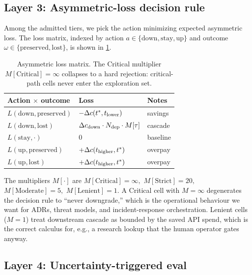 \subsection{Layer 3: Asymmetric-loss decision rule}
\label{sec:layer3}

Among the admitted tiers, we pick the action minimizing expected
asymmetric loss. The loss matrix, indexed by action
$a \in \{\mathrm{down}, \mathrm{stay}, \mathrm{up}\}$ and outcome $\omega
\in \{\mathrm{preserved}, \mathrm{lost}\}$, is shown in
\cref{tab:loss-matrix}.

\begin{table}[h]
\centering
\caption{Asymmetric loss matrix. The Critical multiplier $M[\text{Critical}] = \infty$
collapses to a hard rejection: critical-path cells never enter the
exploration set.}
\label{tab:loss-matrix}
\begin{tabular}{lll}
\toprule
\textbf{Action $\times$ outcome} & \textbf{Loss} & \textbf{Notes} \\
\midrule
$L(\mathrm{down}, \mathrm{preserved})$ & $-\Delta c(t^*, t_{\mathrm{lower}})$ & savings \\
$L(\mathrm{down}, \mathrm{lost})$
  & $\Delta c_{\mathrm{down}} \cdot N_{\mathrm{dep}} \cdot M[\tau]$
  & cascade \\
$L(\mathrm{stay}, \cdot)$ & $0$ & baseline \\
$L(\mathrm{up}, \mathrm{preserved})$ & $+\Delta c(t_{\mathrm{higher}}, t^*)$ & overpay \\
$L(\mathrm{up}, \mathrm{lost})$ & $+\Delta c(t_{\mathrm{higher}}, t^*)$ & overpay \\
\bottomrule
\end{tabular}
\end{table}

The multipliers $M[\cdot]$ are
\(
  M[\text{Critical}] = \infty,
\)
\(
  M[\text{Strict}] = 20,
\)
\(
  M[\text{Moderate}] = 5,
\)
\(
  M[\text{Lenient}] = 1.
\)
A Critical cell with $M = \infty$ degenerates the decision rule to
``never downgrade,'' which is the operational behaviour we want for ADRs,
threat models, and incident-response orchestration. Lenient cells
($M = 1$) treat downstream cascade as bounded by the saved API spend, which
is the correct calculus for, e.g., a research lookup that the human
operator gates anyway.

\subsection{Layer 4: Uncertainty-triggered eval}
\label{sec:layer4}

